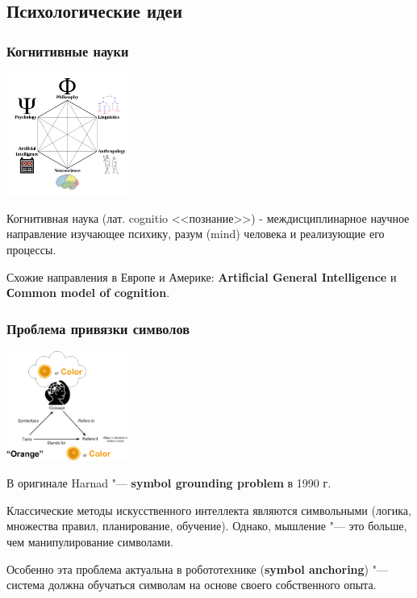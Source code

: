 	\subsection{Психологические идеи}	
	\begin{frame}
		\frametitle{Когнитивные науки}

		\begin{center}
			\includegraphics[width=0.3\textwidth]{cogsci.png}
		\end{center}
		
		Когнитивная наука (лат. cognitio <<познание>>) - междисциплинарное научное направление изучающее психику, разум (mind) человека и реализующие его процессы.
		\par\medskip
		Схожие направления в Европе и Америке: \textbf{Artificial General Intelligence} и \textbf{Сommon model of cognition}.
	\end{frame}

	\begin{frame}
		\frametitle{Проблема привязки символов}
		
		\begin{center}
			\includegraphics[width=0.3\textwidth]{symb_ground.jpg}
		\end{center}
		\scriptsize
		В оригинале Harnad "--- \textbf{symbol grounding problem} в 1990 г. 
		\par\medskip
		Классические методы искусственного интеллекта являются символьными (логика, множества правил, планирование, обучение). Однако, мышление "--- это больше, чем манипулирование символами.
		\par\medskip
		Особенно эта проблема актуальна в робототехнике (\textbf{symbol anchoring}) "--- система должна обучаться символам на основе своего собственного опыта.
		\nocite{*}
		\printbibliography[keyword={sgp}, resetnumbers=true]
	\end{frame}

